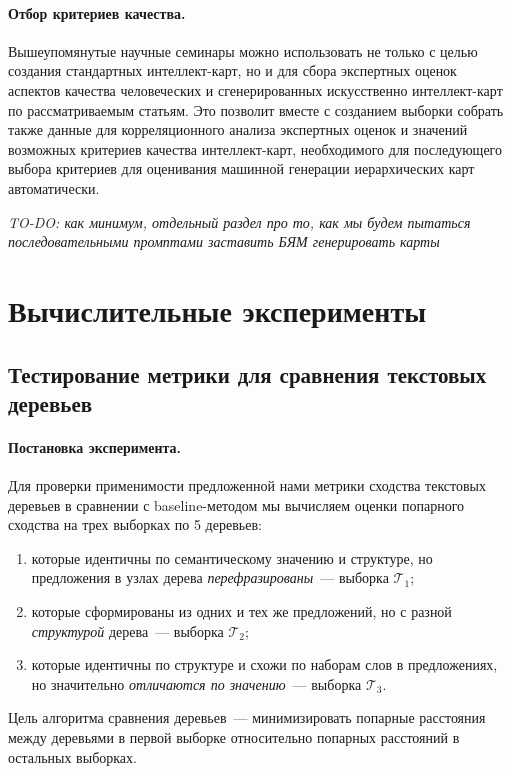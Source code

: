 \documentclass[12pt]{article}
\begin{document}
\paragraph{Отбор критериев качества.} Вышеупомянутые научные семинары можно использовать не только с целью создания стандартных интеллект-карт, но и для сбора экспертных оценок аспектов качества человеческих и сгенерированных искусственно интеллект-карт по рассматриваемым статьям. Это позволит вместе с созданием выборки собрать также данные для корреляционного анализа экспертных оценок и значений возможных критериев качества интеллект-карт, необходимого для последующего выбора критериев для оценивания машинной генерации иерархических карт автоматически.

\textit{TO-DO: как минимум, отдельный раздел про то, как мы будем пытаться последовательными промптами заставить БЯМ генерировать карты} 

\newpage
\section{Вычислительные эксперименты}
\subsection{Тестирование метрики для сравнения текстовых деревьев}
\paragraph{Постановка эксперимента.}  
Для проверки применимости предложенной нами метрики сходства текстовых деревьев в сравнении с baseline-методом мы вычисляем оценки попарного сходства на трех выборках по 5 деревьев:
\begin{enumerate}
    \item которые идентичны по семантическому значению и структуре, но предложения в узлах дерева \textit{перефразированы}~--- выборка $\mathcal{T}_1$;
    \item которые сформированы из одних и тех же предложений, но с разной \textit{структурой} дерева~--- выборка $\mathcal{T}_2$;
    \item которые идентичны по структуре и схожи по наборам слов в предложениях, но значительно \textit{отличаются по значению}~--- выборка $\mathcal{T}_3$.
\end{enumerate}
Цель алгоритма сравнения деревьев~--- минимизировать попарные расстояния между деревьями в первой выборке относительно попарных расстояний в остальных выборках. 
\end{document}
